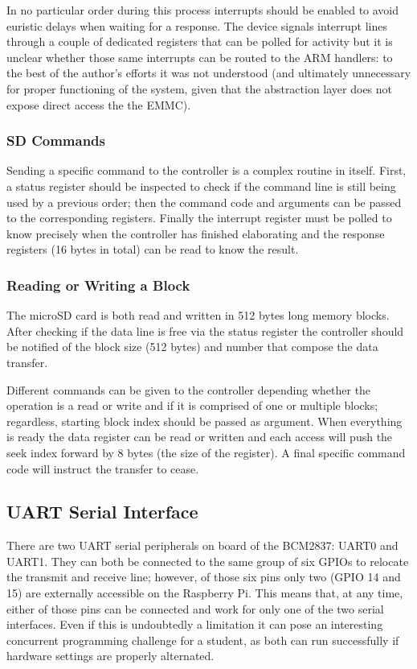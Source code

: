 \documentclass[12pt,a4paper,openright,twoside]{report}
\begin{document}
In no particular order during this process interrupts should be enabled to 
avoid euristic delays when waiting for a response. The device signals interrupt
lines through a couple of dedicated registers that can be polled for activity but
it is unclear whether those same interrupts can be routed to the ARM handlers:
to the best of the author's efforts it was not understood (and ultimately unnecessary
for proper functioning of the system, given that the abstraction layer does not
expose direct access the the EMMC).

\subsubsection{SD Commands}
Sending a specific command to the controller is a complex routine in itself. First,
a status register should be inspected to check if the command line is still being
used by a previous order; then the command code and arguments can be passed to 
the corresponding registers.
Finally the interrupt register must be polled to know precisely when the controller has
finished elaborating and the response registers (16 bytes in total) can be 
read to know the result.

\subsubsection{Reading or Writing a Block}
The microSD card is both read and written in 512 bytes long memory blocks. After
checking if the data line is free via the status register the controller should
be notified of the block size (512 bytes) and number that compose the data transfer.

Different commands can be given to the controller depending whether the operation
is a read or write and if it is comprised of one or multiple blocks; regardless,
starting block index should be passed as argument. When everything
is ready the data register can be read or written and each access will push the seek
index forward by 8 bytes (the size of the register). A final specific command code
will instruct the transfer to cease.


\subsection{UART Serial Interface}
\label{serial}
There are two UART serial peripherals on board of the BCM2837: UART0 and UART1.
They can both be connected to the same group of six GPIOs to relocate the 
transmit and receive line; however, of those six pins only two (GPIO 14 and 15)
are externally accessible on the Raspberry Pi. This means that, at any time,
either of those pins can be connected and work for only one of the two serial
interfaces.
Even if this is undoubtedly a limitation it can pose an interesting
concurrent programming challenge for a student, as both can run successfully if 
hardware settings are properly alternated.
\end{document}
